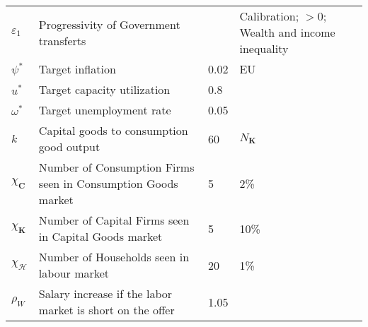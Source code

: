 \documentclass[a4paper, headings=standardclasses]{scrartcl}
\begin{document}
\begin{xltabular}{\linewidth}{lXlX}
    $\varepsilon_1$                   & Progressivity of Government transferts                      &      & Calibration; $>0$; Wealth and income inequality                                                                                                                                                            \\
    $\psi^*$                     & Target inflation                                             & 0.02  & EU                                                                                                                                                            \\
    $u^*$                        & Target capacity utilization                                  & 0.8   &                                                                                                                                                             \\
    $\omega^*$                   & Target unemployment rate                                     & 0.05  &                                                                                                                                                             \\
    $k$                          & Capital goods to consumption good output                     & 60     & $N_\mathbf{K}$                                                                                                                                                            \\
    $\chi_\mathbf{C}$            & Number of Consumption Firms seen in Consumption Goods market & 5      & 2\%                                                                                                                                                            \\
    $\chi_\mathbf{K}$            & Number of Capital Firms seen in Capital Goods market         & 5      & 10\%                                                                                                                                                            \\
    $\chi_\mathcal{H}$           & Number of Households seen in labour market                   & 20      & 1\%                                                                                                                                                            \\
    $\rho_W$                     & Salary increase if the labor market is short on the offer    & 1.05      &                                                                                                                                                             \\

\end{xltabular}
\end{document}
